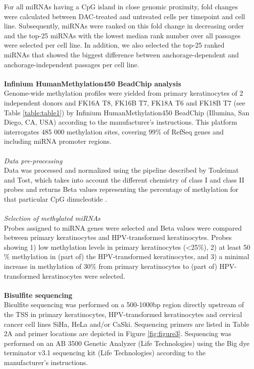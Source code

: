 For all miRNAs having a CpG island in close genomic proximity, fold changes were calculated between DAC-treated and untreated cells per timepoint and cell line. Subsequently, miRNAs were ranked on this fold change in decreasing order and the top-25 miRNAs with the lowest median rank number over all passages were selected per cell line. In addition, we also selected the top-25 ranked miRNAs that showed the biggest difference between anchorage-dependent and anchorage-independent passages per cell line.
\\
\\
\textbf{Infinium HumanMethylation450 BeadChip analysis}
\\
Genome-wide methylation profiles were yielded from primary keratinocytes of 2 independent donors and FK16A T8, FK16B T7, FK18A T6 and FK18B T7 (see Table \ref{table:table1}) by Infinium HumanMethylation450 BeadChip (Illumina, San Diego, CA, USA) according to the manufacturer's instructions. This platform interrogates 485 000 methylation sites, covering 99$\%$ of RefSeq genes and including miRNA promoter regions. 
\\
\\
\textit{Data pre-processing}
\\
Data was processed and normalized using the pipeline described by Touleimat and Tost, which takes into account the different chemistry of class I and class II probes and returns Beta values representing the percentage of methylation for that particular CpG dinucleotide \cite{Touleimat2012}.
\\
\\
\textit{Selection of methylated miRNAs}
\\
Probes assigned to miRNA genes were selected and Beta values were compared between primary keratinocytes and HPV-transformed keratinocytes. Probes showing 1) low methylation levels in primary keratinocytes (<25$\%$), 2) at least 50$\%$ methylation in (part of) the HPV-transformed keratinocytes, and 3) a minimal increase in methylation of 30$\%$ from primary keratinocytes to (part of) HPV-transformed keratinocytes were selected.
\\
\\
\textbf{Bisulfite sequencing}
\\
Bisulfite sequencing was performed on a 500-1000bp region directly upstream of the TSS in primary keratinocytes, HPV-transformed keratinocytes and cervical cancer cell lines SiHa, HeLa and/or CaSki. Sequencing primers are listed in Table 2A and primer locations are depicted in Figure \ref{fig:figure3}. Sequencing was performed on an AB 3500 Genetic Analyzer (Life Technologies) using the Big dye terminator v3.1 sequencing kit (Life Technologies) according to the manufacturer’s instructions.

